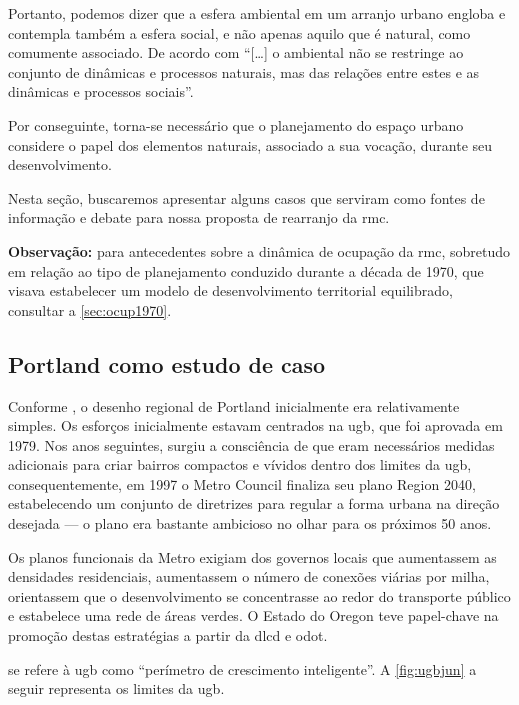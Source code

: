 	Portanto, podemos dizer que a esfera ambiental em um arranjo urbano engloba e contempla também a esfera social, e não apenas aquilo que é natural, como comumente associado. De acordo com
	 ``[\dots] o ambiental não se restringe ao conjunto de dinâmicas e processos naturais, mas das relações entre estes e as dinâmicas e processos sociais''.
	
	Por conseguinte, torna-se necessário que o planejamento do espaço urbano considere o papel dos elementos naturais, associado a sua vocação, durante seu desenvolvimento.
	
	Nesta seção, buscaremos apresentar alguns casos que serviram como fontes de informação e debate para nossa proposta de rearranjo da \glsdesc{rmc}.
	
	\textbf{Observação:} para antecedentes sobre a dinâmica de ocupação da \glsdesc{rmc}, sobretudo em relação ao tipo de planejamento conduzido durante a década de 1970, que visava estabelecer um modelo de desenvolvimento territorial equilibrado, consultar a \autoref{sec:ocup1970}.
	
	\subsection{Portland como estudo de caso}
	
	Conforme , o desenho regional de Portland inicialmente era relativamente simples. Os esforços inicialmente estavam centrados na \gls{ugb}, que foi aprovada em 1979. Nos anos seguintes, surgiu a consciência de que eram necessários medidas adicionais para criar bairros compactos e vívidos dentro dos limites da \gls{ugb}, consequentemente, em 1997 o Metro Council finaliza seu plano Region 2040, estabelecendo um conjunto de diretrizes para regular a forma urbana na direção desejada --- o plano era bastante ambicioso no olhar para os próximos 50 anos.
	
	Os planos funcionais da Metro exigiam dos governos locais que aumentassem as densidades residenciais, aumentassem o número de conexões viárias por milha, orientassem que o desenvolvimento se concentrasse ao redor do transporte público e estabelece uma rede de áreas verdes. O Estado do Oregon teve papel-chave na promoção destas estratégias a partir da \gls{dlcd} e \gls{odot}.
	
	 se refere à \gls{ugb} como “perímetro de crescimento inteligente”. A \autoref{fig:ugbjun} a seguir representa os limites da \gls{ugb}.
	
